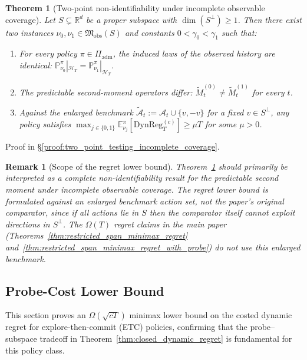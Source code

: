 \documentclass{article}
\newcommand{\R}{\mathbb{R}}
\newcommand{\E}{\mathbb{E}}
\newcommand{\Prob}{\mathbb{P}}
\newcommand{\cA}{\mathcal{A}}
\newcommand{\cH}{\mathcal{H}}
\newcommand{\DynReg}{\mathrm{DynReg}}
\newtheorem{theorem}{Theorem}
\newtheorem{remark}{Remark}
\begin{document}
\begin{theorem}[Two-point non-identifiability under incomplete observable coverage]
\label{thm:two_point_testing_incomplete_coverage}
Let $S\subsetneq \R^d$ be a proper subspace with $\dim(S^\perp)\ge 1$.
Then there exist two instances $\nu_0,\nu_1 \in \mathfrak M_{\mathrm{obs}}(S)$ and constants $0<\gamma_0<\gamma_1$ such that:
\begin{enumerate}[label=(\roman*)]
    \item For every policy $\pi \in \Pi_{\mathrm{adm}}$, the induced laws of the observed history are identical: $\Prob_{\nu_0}^\pi|_{\cH_T} = \Prob_{\nu_1}^\pi|_{\cH_T}$.
    \item The predictable second-moment operators differ: $\widetilde{M}_t^{(0)} \ne \widetilde{M}_t^{(1)}$ for every $t$.
    \item Against the enlarged benchmark $\widetilde{\cA}_t := \cA_t \cup \{v, -v\}$ for a fixed $v \in S^\perp$, any policy satisfies $\max_{j\in\{0,1\}} \E_{\nu_j}^\pi[\DynReg_T^{(c)}] \ge \mu T$ for some $\mu > 0$.
\end{enumerate}
\end{theorem}

Proof in \S\ref{proof:two_point_testing_incomplete_coverage}.

\begin{remark}[Scope of the regret lower bound]
\label{rem:scope_augmented_regret_lb}
Theorem~\ref{thm:two_point_testing_incomplete_coverage} should primarily be interpreted as a complete non-identifiability result for the predictable second moment under incomplete observable coverage. The regret lower bound is formulated against an enlarged benchmark action set, not the paper's original comparator, since if all actions lie in $S$ then the comparator itself cannot exploit directions in $S^\perp$.   The $\Omega(T)$ regret claims in the main paper
(Theorems~\ref{thm:restricted_span_minimax_regret} and~\ref{thm:restricted_span_minimax_regret_with_probe}) do not use this enlarged benchmark.
\end{remark}

\subsection{Probe-Cost Lower Bound}
\label{app:probe_cost_lower_bound}

This section proves an $\Omega(\sqrt{cT})$ minimax lower bound on the costed dynamic regret for explore-then-commit (ETC) policies, confirming that the probe--subspace tradeoff in
Theorem~\ref{thm:closed_dynamic_regret} is fundamental for this policy class.
\end{document}
